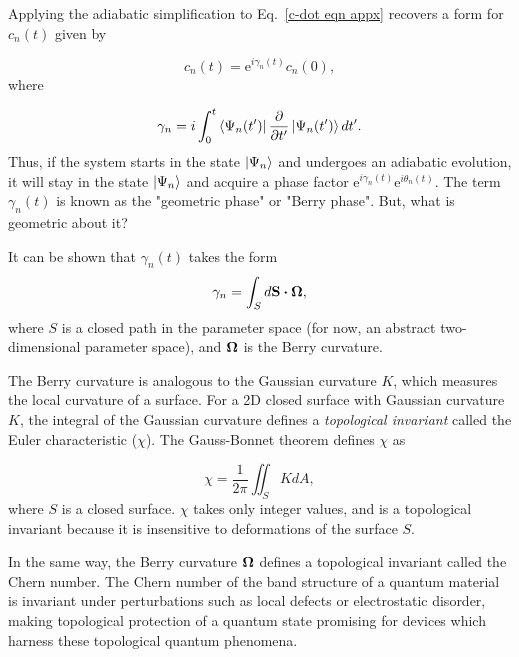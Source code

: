 \documentclass[double,12pt,1in,seploa]{beavtex}
\begin{document}
Applying the adiabatic simplification to Eq.\ \ref{c-dot eqn appx} recovers a form for $c_n(t)$ given by

\begin{equation}
    c_n(t) = \mathrm{e}^{i \gamma_n(t)}c_n(0),
\end{equation}
where 

\begin{equation}
    \gamma_n = i \int_{0}^{t} \bra{\Psi_n(t')}\pdv{t'}\ket{\Psi_n(t')} dt'. \label{geometric phase}
\end{equation}
Thus, if the system starts in the state $\ket{\Psi_n}$ and undergoes an adiabatic evolution, it will stay in the state $\ket{\Psi_n}$ and acquire a phase factor $\mathrm{e}^{i \gamma_n(t)} \mathrm{e}^{i \theta_n(t)}$. The term $\gamma_n(t)$ is known as the "geometric phase" or "Berry phase". But, what is geometric about it? 

It can be shown that $\gamma_n(t)$ takes the form \cite[p.\ 349-351]{sakurai_modern_1985}
\begin{equation}
    \gamma_n = \int_{S} d\vectorbold{S}\dotproduct \vectorbold{\Omega},
\end{equation}
where $S$ is a closed path in the parameter space (for now, an abstract two-dimensional parameter space), and $\vectorbold{\Omega}$ is the Berry curvature. 

The Berry curvature is analogous to the Gaussian curvature $K$, which measures the local curvature of a surface. For a 2D closed surface with Gaussian curvature $K$, the integral of the Gaussian curvature defines a \textit{topological invariant} called the Euler characteristic ($\chi$). The Gauss-Bonnet theorem defines $\chi$ as

\begin{equation}
    \chi = \frac{1}{2\pi}\iint_S K dA,
\end{equation}
where $S$ is a closed surface. $\chi$ takes only integer values, and is a topological invariant because it is insensitive to deformations of the surface $S$. 

In the same way, the Berry curvature $\vectorbold{\Omega}$ defines a topological invariant called the Chern number. The Chern number of the band structure of a quantum material is invariant under perturbations such as local defects or electrostatic disorder, making topological protection of a quantum state promising for devices which harness these topological quantum phenomena. 
\end{document}
